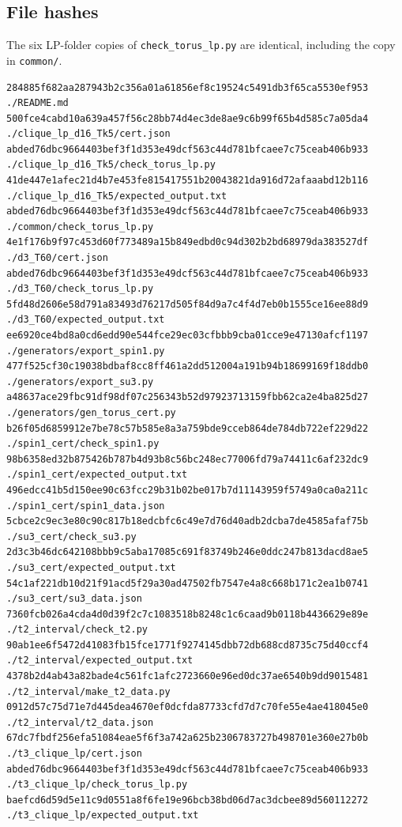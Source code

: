 \documentclass[11pt]{article}
\theoremstyle{definition}
\theoremstyle{remark}
\begin{document}
\subsection*{File hashes}
The six LP-folder copies of \texttt{check\_torus\_lp.py} are identical, including the copy in \texttt{common/}.
\begin{Verbatim}[fontsize=\scriptsize]
284885f682aa287943b2c356a01a61856ef8c19524c5491db3f65ca5530ef953  ./README.md
500fce4cabd10a639a457f56c28bb74d4ec3de8ae9c6b99f65b4d585c7a05da4  ./clique_lp_d16_Tk5/cert.json
abded76dbc9664403bef3f1d353e49dcf563c44d781bfcaee7c75ceab406b933  ./clique_lp_d16_Tk5/check_torus_lp.py
41de447e1afec21d4b7e453fe815417551b20043821da916d72afaaabd12b116  ./clique_lp_d16_Tk5/expected_output.txt
abded76dbc9664403bef3f1d353e49dcf563c44d781bfcaee7c75ceab406b933  ./common/check_torus_lp.py
4e1f176b9f97c453d60f773489a15b849edbd0c94d302b2bd68979da383527df  ./d3_T60/cert.json
abded76dbc9664403bef3f1d353e49dcf563c44d781bfcaee7c75ceab406b933  ./d3_T60/check_torus_lp.py
5fd48d2606e58d791a83493d76217d505f84d9a7c4f4d7eb0b1555ce16ee88d9  ./d3_T60/expected_output.txt
ee6920ce4bd8a0cd6edd90e544fce29ec03cfbbb9cba01cce9e47130afcf1197  ./generators/export_spin1.py
477f525cf30c19038bdbaf8cc8ff461a2dd512004a191b94b18699169f18ddb0  ./generators/export_su3.py
a48637ace29fbc91df98df07c256343b52d97923713159fbb62ca2e4ba825d27  ./generators/gen_torus_cert.py
b26f05d6859912e7be78c57b585e8a3a759bde9cceb864de784db722ef229d22  ./spin1_cert/check_spin1.py
98b6358ed32b875426b787b4d93b8c56bc248ec77006fd79a74411c6af232dc9  ./spin1_cert/expected_output.txt
496edcc41b5d150ee90c63fcc29b31b02be017b7d11143959f5749a0ca0a211c  ./spin1_cert/spin1_data.json
5cbce2c9ec3e80c90c817b18edcbfc6c49e7d76d40adb2dcba7de4585afaf75b  ./su3_cert/check_su3.py
2d3c3b46dc642108bbb9c5aba17085c691f83749b246e0ddc247b813dacd8ae5  ./su3_cert/expected_output.txt
54c1af221db10d21f91acd5f29a30ad47502fb7547e4a8c668b171c2ea1b0741  ./su3_cert/su3_data.json
7360fcb026a4cda4d0d39f2c7c1083518b8248c1c6caad9b0118b4436629e89e  ./t2_interval/check_t2.py
90ab1ee6f5472d41083fb15fce1771f9274145dbb72db688cd8735c75d40ccf4  ./t2_interval/expected_output.txt
4378b2d4ab43a82bade4c561fc1afc2723660e96ed0dc37ae6540b9dd9015481  ./t2_interval/make_t2_data.py
0912d57c75d71e7d445dea4670ef0dcfda87733cfd7d7c70fe55e4ae418045e0  ./t2_interval/t2_data.json
67dc7fbdf256efa51084eae5f6f3a742a625b2306783727b498701e360e27b0b  ./t3_clique_lp/cert.json
abded76dbc9664403bef3f1d353e49dcf563c44d781bfcaee7c75ceab406b933  ./t3_clique_lp/check_torus_lp.py
baefcd6d59d5e11c9d0551a8f6fe19e96bcb38bd06d7ac3dcbee89d560112272  ./t3_clique_lp/expected_output.txt

\end{Verbatim}
\end{document}
